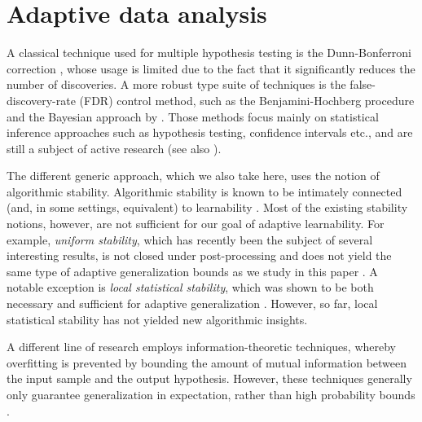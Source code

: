 \documentclass[12pt,a4paper,oneside,onecolumn]{book}
\begin{document}
\section{Adaptive data analysis}
%
%
A classical technique used for multiple hypothesis testing is the Dunn-Bonferroni correction \citep{shaffer1995multiple,dunn1961multiple}, 
whose usage is limited due to the fact that it significantly reduces the number of discoveries. 
A more robust type suite of techniques is the false-discovery-rate (FDR) control method, such as the Benjamini-Hochberg procedure \citep{benjamini1995controlling} and the Bayesian approach by \citet{storey2003positive}. 
Those methods focus mainly on statistical inference approaches such as hypothesis testing, confidence intervals etc., and are still a subject of active research (see also \cite{li2017accumulation,javanmard2015online}). 

The different generic approach, which we also take here, uses the notion of algorithmic stability.
Algorithmic stability is known to be intimately connected (and, in some settings, equivalent) to
learnability \citep{bousquet2002stability,shalev2010learnability}. Most of the existing stability notions, however, are not sufficient for our goal of adaptive learnability. For example, {\em uniform stability}, which has recently been the subject of several interesting results, is not closed under post-processing and does not yield the same type of adaptive generalization bounds as we study in this paper \citep{BousquetE02,Shalev-ShwartzSSS10,pmlr-v48-hardt16,FeldmanV18,FeldmanV19}. 
A notable exception is {\em local statistical stability}, which was shown to be both necessary and sufficient for adaptive generalization \citep{ShenfeldL19}. However, so far, local statistical stability has not yielded new algorithmic insights.


A different line of research employs information-theoretic techniques,
whereby overfitting is prevented by bounding the amount of mutual information
between the input sample and the output hypothesis.
However, these techniques generally only guarantee generalization in expectation, rather than high probability bounds \citep{pmlr-v51-russo16,NIPS2017_6846,RogersRST16,RaginskyRTWX16,russo2019much,SteinkeZ20}.
\end{document}
